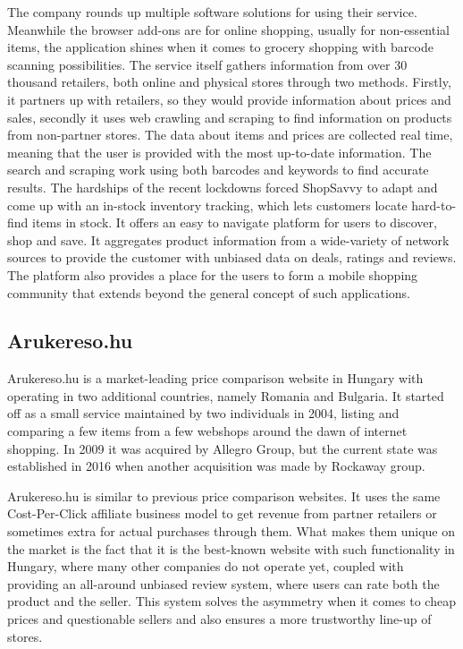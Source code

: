The company rounds up multiple software solutions for using their service. Meanwhile the browser add-ons are for online shopping, usually for non-essential items, the application shines when it comes to grocery shopping with barcode scanning possibilities. The service itself gathers information from over 30 thousand retailers, both online and physical stores through two methods. Firstly, it partners up with retailers, so they would provide information about prices and sales, secondly it uses web crawling and scraping to find information on products from non-partner stores. The data about items and prices are collected real time, meaning that the user is provided with the most up-to-date information. The search and scraping work using both barcodes and keywords to find accurate results. The hardships of the recent lockdowns forced ShopSavvy to adapt and come up with an in-stock inventory tracking, which lets customers locate hard-to-find items in stock. It offers an easy to navigate platform for users to discover, shop and save. It aggregates product information from a wide-variety of network sources to provide the customer with unbiased data on deals, ratings and reviews. The platform also provides a place for the users to form a mobile shopping community that extends beyond the general concept of such applications. \cite{shopsavvy2020}

\subsection{Arukereso.hu}

Arukereso.hu is a market-leading price comparison website in Hungary with operating in two additional countries, namely Romania and Bulgaria. It started off as a small service maintained by two individuals in 2004, listing and comparing a few items from a few webshops around the dawn of internet shopping. In 2009 it was acquired by Allegro Group, but the current state was established in 2016 when another acquisition was made by Rockaway group. \cite{arukeresoLinkedin}

Arukereso.hu is similar to previous price comparison websites. It uses the same Cost-Per-Click affiliate business model to get revenue from partner retailers or sometimes extra for actual purchases through them. What makes them unique on the market is the fact that it is the best-known website with such functionality in Hungary, where many other companies do not operate yet, coupled with providing an all-around unbiased review system, where users can rate both the product and the seller. This system solves the asymmetry when it comes to cheap prices and questionable sellers and also ensures a more trustworthy line-up of stores. \cite{karacsony2019}

